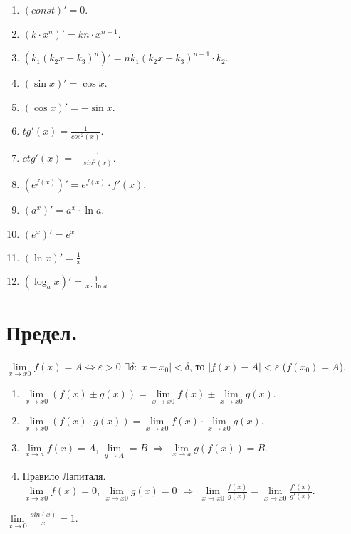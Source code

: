 \documentclass{article}
\begin{document}
	\begin{property}
		\begin{enumerate}
			\item $(const)' = 0$.
			\item $(k \cdot x^n)' = kn \cdot x^{n - 1}$.
			\item $(k_1(k_2x + k_3)^n)' = nk_1(k_2x + k_3)^{n - 1} \cdot k_2$.
			\item $(\sin x)' = \cos x$.
			\item $(\cos x)' = - \sin x$.
			\item $tg'(x) = \frac{1}{cos^2(x)}$.
			\item $ctg'(x) = - \frac{1}{sin^2(x)}$.
			\item $(e^{f(x)})' = e^{f(x)} \cdot f'(x)$.
			\item $(a^x)' = a^x \cdot \ln a$.
			\item $(e^x)' = e^x$
			\item $(\ln x)' = \frac{1}{x}$
			\item $(\log_a x)' = \frac{1}{x \cdot \ln a}$
		\end{enumerate}
	\end{property}
	\section{Предел.}
	\begin{definition}[По Коши]
		$\lim \limits_{x \rightarrow x0} f(x) = A \Leftrightarrow \varepsilon > 0$ $\exists \delta: |x - x_0| < \delta$, то $|f(x) - A| < \varepsilon$ ($f(x_0) = A$).
	\end{definition}
	\begin{property}
		\begin{enumerate}
			\item $\lim \limits_{x \rightarrow x0} (f(x) \pm g(x)) = \lim \limits_{x \rightarrow x0} f(x) \pm \lim \limits_{x \rightarrow x0} g(x)$.
			\item $\lim \limits_{x \rightarrow x0} (f(x) \cdot g(x)) = \lim \limits_{x \rightarrow x0} f(x) \cdot \lim \limits_{x \rightarrow x0} g(x)$.
			\item $\lim \limits_{x \rightarrow a} f(x) = A$, $\lim \limits_{y \rightarrow A} = B$ $\Rightarrow$ $\lim \limits_{x \rightarrow a} g(f(x)) = B$.
			\item Правило Лапиталя. \\
			$\lim \limits_{x \rightarrow x0} f(x) = 0$, $\lim \limits_{x \rightarrow x0} g(x) = 0$ $\Rightarrow$ $\lim \limits_{x \rightarrow x0} \frac{f(x)}{g(x)} = \lim \limits_{x \rightarrow x0} \frac{f'(x)}{g'(x)}$.
		\end{enumerate}
	\end{property}
	\begin{statement}
		$\lim \limits_{x \rightarrow 0} \frac{sin(x)}{x} = 1$.
	\end{statement}
\end{document}
